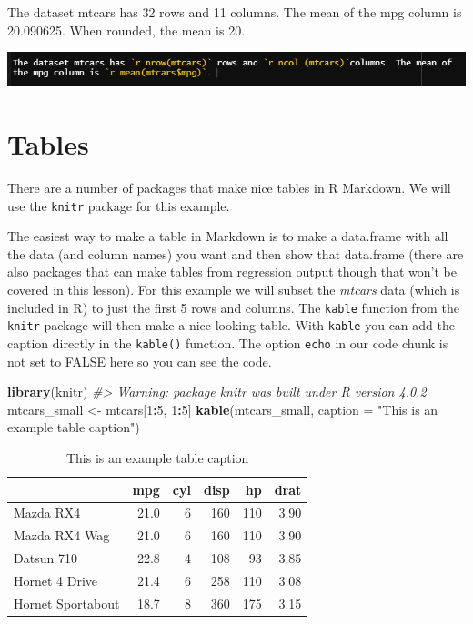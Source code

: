 \documentclass[
  12pt,
]{book}
\newenvironment{Shaded}{\begin{snugshade}}{\end{snugshade}}
\newcommand{\CommentTok}[1]{\textcolor[rgb]{0.37,0.37,0.37}{\textit{#1}}}
\newcommand{\DataTypeTok}[1]{\textcolor[rgb]{0.27,0.27,0.27}{#1}}
\newcommand{\DecValTok}[1]{\textcolor[rgb]{0.06,0.06,0.06}{#1}}
\newcommand{\KeywordTok}[1]{\textcolor[rgb]{0.27,0.27,0.27}{\textbf{#1}}}
\newcommand{\NormalTok}[1]{#1}
\newcommand{\OperatorTok}[1]{\textcolor[rgb]{0.43,0.43,0.43}{\textbf{#1}}}
\newcommand{\StringTok}[1]{\textcolor[rgb]{0.5,0.5,0.5}{#1}}
\begin{document}
The dataset mtcars has 32 rows and 11 columns. The mean of the mpg column is 20.090625. When rounded, the mean is 20.

\includegraphics{images/inline_code.PNG}

\hypertarget{tables}{%
\section{Tables}\label{tables}}

There are a number of packages that make nice tables in R Markdown. We will use the \texttt{knitr} package for this example.

The easiest way to make a table in Markdown is to make a data.frame with all the data (and column names) you want and then show that data.frame (there are also packages that can make tables from regression output though that won't be covered in this lesson). For this example we will subset the \emph{mtcars} data (which is included in R) to just the first 5 rows and columns. The \texttt{kable} function from the \texttt{knitr} package will then make a nice looking table. With \texttt{kable} you can add the caption directly in the \texttt{kable()} function. The option \texttt{echo} in our code chunk is not set to FALSE here so you can see the code.

\begin{Shaded}
\begin{Highlighting}[]
\KeywordTok{library}\NormalTok{(knitr)}
\CommentTok{\#> Warning: package \textquotesingle{}knitr\textquotesingle{} was built under R version 4.0.2}
\NormalTok{mtcars\_small <{-}}\StringTok{ }\NormalTok{mtcars[}\DecValTok{1}\OperatorTok{:}\DecValTok{5}\NormalTok{, }\DecValTok{1}\OperatorTok{:}\DecValTok{5}\NormalTok{]}
\KeywordTok{kable}\NormalTok{(mtcars\_small, }\DataTypeTok{caption =} \StringTok{"This is an example table caption"}\NormalTok{)}
\end{Highlighting}
\end{Shaded}

\begin{table}

\caption{\label{tab:unnamed-chunk-1}This is an example table caption}
\centering
\begin{tabular}[t]{l|r|r|r|r|r}
\hline
  & mpg & cyl & disp & hp & drat\\
\hline
Mazda RX4 & 21.0 & 6 & 160 & 110 & 3.90\\
\hline
Mazda RX4 Wag & 21.0 & 6 & 160 & 110 & 3.90\\
\hline
Datsun 710 & 22.8 & 4 & 108 & 93 & 3.85\\
\hline
Hornet 4 Drive & 21.4 & 6 & 258 & 110 & 3.08\\
\hline
Hornet Sportabout & 18.7 & 8 & 360 & 175 & 3.15\\
\hline
\end{tabular}
\end{table}
\end{document}
